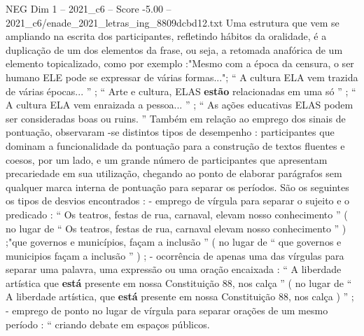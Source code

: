 \begin{textsample}{NEG Dim 1 – 2021\_c6 – Score -5.00 – 2021\_c6/enade\_2021\_letras\_ing\_8809dcbd12.txt}
Uma estrutura que vem se ampliando na escrita dos participantes, refletindo hábitos da oralidade, é a duplicação de um dos elementos da frase, ou seja, a retomada anafórica de um elemento topicalizado, como por exemplo :"Mesmo com a época da censura, o ser humano ELE pode se expressar de várias formas..."; “ A cultura ELA vem trazida de várias épocas... ” ; “ Arte e cultura, ELAS \textbf{estão} relacionadas em uma só ” ; “ A cultura ELA vem enraizada a pessoa... ” ; “ As ações educativas ELAS podem ser consideradas boas ou ruins. ” Também em relação ao emprego dos sinais de pontuação, observaram -se distintos tipos de desempenho : participantes que dominam a funcionalidade da pontuação para a construção de textos fluentes e coesos, por um lado, e um grande número de participantes que apresentam precariedade em sua utilização, chegando ao ponto de elaborar parágrafos sem qualquer marca interna de pontuação para separar os períodos.
São os seguintes os tipos de desvios encontrados : - emprego de vírgula para separar o sujeito e o predicado : “ Os teatros, festas de rua, carnaval, elevam nosso conhecimento ” ( no lugar de “ Os teatros, festas de rua, carnaval elevam nosso conhecimento ” ) ;"que governos e municípios, façam a inclusão ” ( no lugar de “ que governos e municipios façam a inclusão ” ) ; - ocorrência de apenas uma das vírgulas para separar uma palavra, uma expressão ou uma oração encaixada : “ A liberdade artística que \textbf{está} presente em nossa Constituição 88, nos calça ” ( no lugar de “ A liberdade artística, que \textbf{está} presente em nossa Constituição 88, nos calça ) ” ; - emprego de ponto no lugar de vírgula para separar orações de um mesmo período : “ criando debate em espaços públicos.

\end{textsample}
